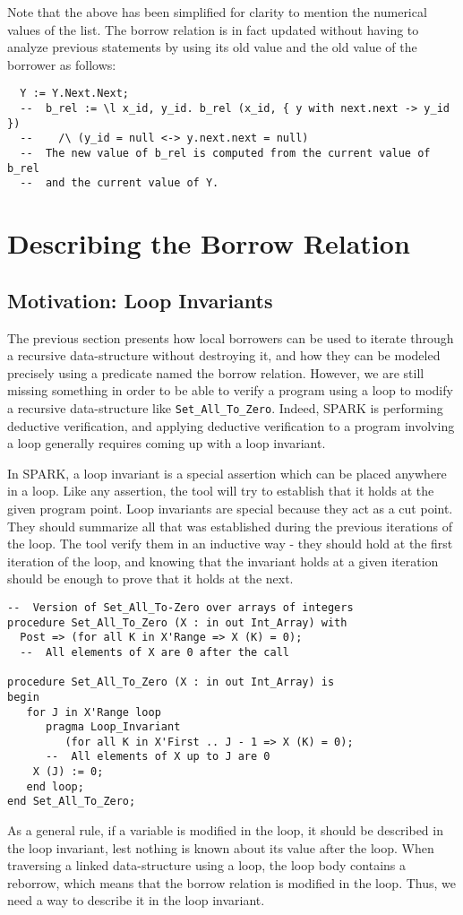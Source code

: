 \documentclass[runningheads]{llncs}
\begin{document}
Note that the above has been simplified for clarity to mention the numerical values of the list. The borrow relation is in fact updated without having to analyze previous statements by using its old value and the old value of the borrower as follows:
\begin{lstlisting}
  Y := Y.Next.Next;
  --  b_rel := \l x_id, y_id. b_rel (x_id, { y with next.next -> y_id })
  --    /\ (y_id = null <-> y.next.next = null)
  --  The new value of b_rel is computed from the current value of b_rel
  --  and the current value of Y.
\end{lstlisting}
\section{Describing the Borrow Relation}
\subsection{Motivation: Loop Invariants}
The previous section presents how local borrowers can be used to iterate through a recursive data-structure without destroying it, and how they can be modeled precisely using a predicate named the borrow relation. However, we are still missing something in order to be able to verify a program using a loop to modify a recursive data-structure like \texttt{Set\_All\_To\_Zero}. Indeed, SPARK is performing deductive verification, and applying deductive verification to a program involving a loop generally requires coming up with a loop invariant.

In SPARK, a loop invariant is a special assertion which can be placed anywhere in a loop. Like any assertion, the tool will try to establish that it holds at the given program point. Loop invariants are special because they act as a cut point. They should summarize all that was established during the previous iterations of the loop. The tool verify them in an inductive way - they should hold at the first iteration of the loop, and knowing that the invariant holds at a given iteration should be enough to prove that it holds at the next.
\begin{lstlisting}
--  Version of Set_All_To-Zero over arrays of integers
procedure Set_All_To_Zero (X : in out Int_Array) with
  Post => (for all K in X'Range => X (K) = 0);
  --  All elements of X are 0 after the call

procedure Set_All_To_Zero (X : in out Int_Array) is
begin
   for J in X'Range loop
      pragma Loop_Invariant
         (for all K in X'First .. J - 1 => X (K) = 0);
      --  All elements of X up to J are 0
  	X (J) := 0;
   end loop;
end Set_All_To_Zero;
\end{lstlisting}
As a general rule, if a variable is modified in the loop, it should be described in the loop invariant, lest nothing is known about its value after the loop. When traversing a linked data-structure using a loop, the loop body contains a reborrow, which means that the borrow relation is modified in the loop. Thus, we need a way to describe it in the loop invariant.
\end{document}
